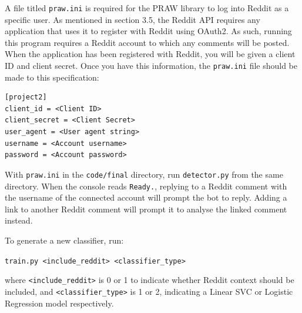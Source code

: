 \documentclass[a4paper,12pt]{article}
\begin{document}
A file titled \texttt{praw.ini} is required for the PRAW library to log into Reddit as a specific user. As mentioned in section 3.5, the Reddit API requires any application that uses it to register with Reddit using OAuth2. As such, running this program requires a Reddit account to which any comments will be posted. When the application has been registered with Reddit, you will be given a client ID and client secret. Once you have this information, the \texttt{praw.ini} file should be made to this specification:

\begin{verbatim}
[project2]
client_id = <Client ID>
client_secret = <Client Secret>
user_agent = <User agent string>
username = <Account username>
password = <Account password>
\end{verbatim}

With \texttt{praw.ini} in the \texttt{code/final} directory, run
\texttt{detector.py}
from the same directory. When the console reads \texttt{Ready.}, replying to a Reddit comment with the username of the connected account will prompt the bot to reply. Adding a link to another Reddit comment will prompt it to analyse the linked comment instead.

To generate a new classifier, run:
 
\texttt{train.py <include\_reddit> <classifier\_type>}

where \texttt{<include\_reddit>} is 0 or 1 to indicate whether Reddit context should be included, and \texttt{<classifier\_type>} is 1 or 2, indicating a Linear SVC or Logistic Regression model respectively.
\end{document}
